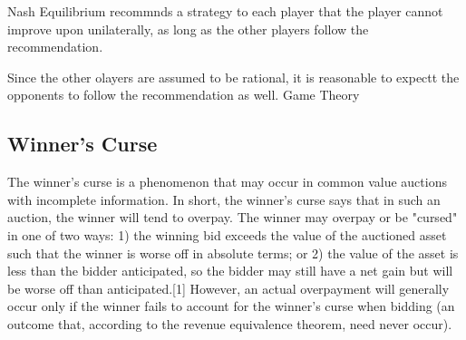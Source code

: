 Nash Equilibrium recommnds a strategy to each player that the player cannot improve upon unilaterally, as long as the other players follow the recommendation.

Since the other olayers are assumed to be rational, it is reasonable to expectt the opponents to follow the recommendation as well.
Game Theory
\subsection{Winner's Curse}
The winner's curse is a phenomenon that may occur in common value auctions with incomplete information. In short, the winner's curse says that in such an auction, the winner will tend to overpay. The winner may overpay or be "cursed" in one of two ways: 1) the winning bid exceeds the value of the auctioned asset such that the winner is worse off in absolute terms; or 2) the value of the asset is less than the bidder anticipated, so the bidder may still have a net gain but will be worse off than anticipated.[1] However, an actual overpayment will generally occur only if the winner fails to account for the winner's curse when bidding (an outcome that, according to the revenue equivalence theorem, need never occur).
